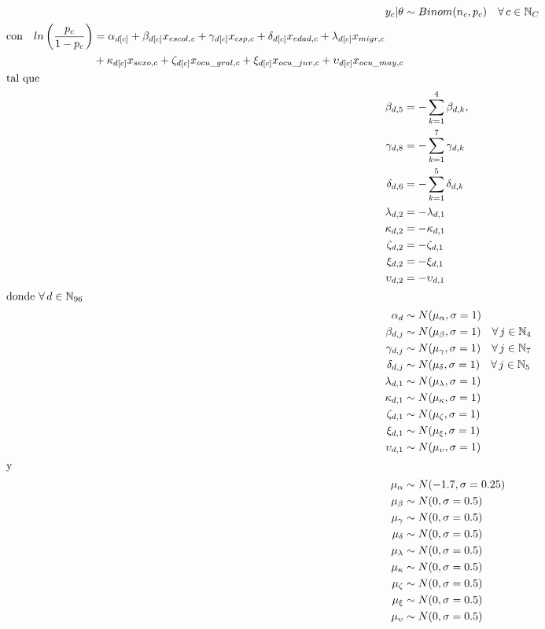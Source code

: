 \begin{align}\label{eq:Modelo_Comp_H}
y_c|\theta & \sim Binom(n_c,p_c) \quad \forall \, c \in \mathbb{N}_C \nonumber \\
\begin{split}
\text{con} \quad ln\left(\dfrac{p_c}{1-p_c}\right) &= \alpha_{d[c]} + \beta_{d[c]} x_{escol,c} + \gamma_{d[c]} x_{csp,c} + \delta_{d[c]} x_{edad,c} + \lambda_{d[c]} x_{migr,c} \\
&+ \kappa_{d[c]} x_{sexo,c} + \zeta_{d[c]} x_{ocu\_gral,c} + \xi_{d[c]} x_{ocu\_juv,c} + \upsilon_{d[c]} x_{ocu\_may,c} 
\end{split}\\
\shortintertext{tal que} 
\beta_{d,5} &= -\sum\limits_{k = 1}^{4} \beta_{d,k}, \nonumber \\
\gamma_{d,8} &= -\sum\limits_{k = 1}^{7} \gamma_{d,k} \nonumber \\
\delta_{d,6} &= -\sum\limits_{k = 1}^{5} \delta_{d,k} \nonumber \\
\lambda_{d,2} &= -\lambda_{d,1} \nonumber \\
\kappa_{d,2} &= -\kappa_{d,1} \nonumber \\
\zeta_{d,2} &= -\zeta_{d,1} \nonumber \\
\xi_{d,2} &= -\xi_{d,1} \nonumber \\
\upsilon_{d,2} &= -\upsilon_{d,1} \nonumber \\
\shortintertext{donde $\forall \, d \in \mathbb{N}_{96}$}
\alpha_d &\sim N(\mu_{\alpha}, \sigma=1) \quad  \nonumber \\
\beta_{d,j} &\sim N(\mu_{\beta}, \sigma=1) \quad \forall \, j \in \mathbb{N}_{4} \nonumber \\
\gamma_{d,j} &\sim N(\mu_{\gamma}, \sigma=1) \quad \forall \, j \in \mathbb{N}_{7} \nonumber \\
\delta_{d,j} &\sim N(\mu_{\delta}, \sigma=1) \quad \forall \, j \in \mathbb{N}_{5}  \nonumber \\ 
\lambda_{d,1} &\sim N(\mu_{\lambda}, \sigma=1) \nonumber \\
\kappa_{d,1} &\sim N(\mu_{\kappa}, \sigma=1) \nonumber \\ 
\zeta_{d,1} &\sim N(\mu_{\zeta}, \sigma=1) \nonumber \\
\xi_{d,1} &\sim N(\mu_{\xi}, \sigma=1) \nonumber \\
\upsilon_{d,1} &\sim N(\mu_{\upsilon}, \sigma=1) \nonumber \\
\shortintertext{y}
\mu_{\alpha} &\sim N(-1.7,\sigma=0.25) \nonumber \\
\mu_{\beta} &\sim N(0,\sigma=0.5) \nonumber \\
\mu_{\gamma} &\sim N(0,\sigma=0.5) \nonumber \\
\mu_{\delta} &\sim N(0,\sigma=0.5) \nonumber \\
\mu_{\lambda} &\sim N(0,\sigma=0.5) \nonumber \\
\mu_{\kappa} &\sim N(0,\sigma=0.5) \nonumber \\
\mu_{\zeta} &\sim N(0,\sigma=0.5) \nonumber \\
\mu_{\xi} &\sim N(0,\sigma=0.5) \nonumber \\
\mu_{\upsilon} &\sim N(0,\sigma=0.5) \nonumber
\end{align}

